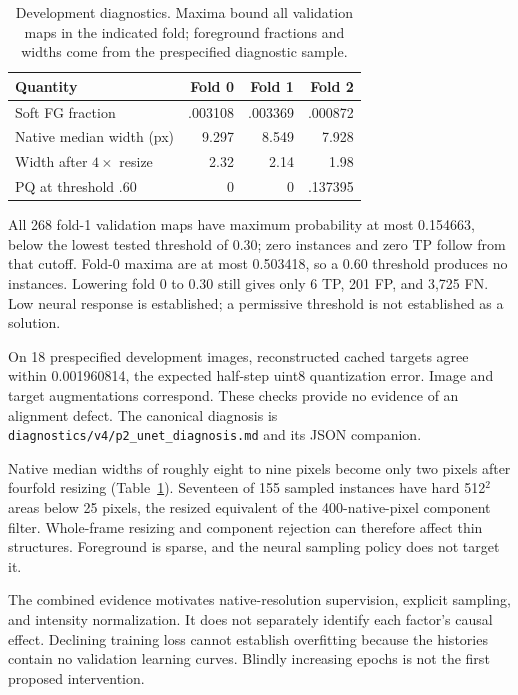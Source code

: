 \documentclass[sigconf]{acmart}
\begin{document}
\begin{table}[t]
\caption{Development diagnostics. Maxima bound all validation maps in the indicated fold; foreground fractions and widths come from the prespecified diagnostic sample.}
\label{tab:diag}
\centering
\begin{tabular}{lrrr}
\toprule
Quantity & Fold 0 & Fold 1 & Fold 2\\
\midrule
Soft FG fraction & .003108 & .003369 & .000872\\
Native median width (px) & 9.297 & 8.549 & 7.928\\
Width after $4\times$ resize & 2.32 & 2.14 & 1.98\\
PQ at threshold .60 & 0 & 0 & .137395\\
\bottomrule
\end{tabular}
\end{table}

All 268 fold-1 validation maps have maximum probability at most 0.154663, below the lowest tested threshold of 0.30; zero instances and zero TP follow from that cutoff. Fold-0 maxima are at most 0.503418, so a 0.60 threshold produces no instances. Lowering fold 0 to 0.30 still gives only 6 TP, 201 FP, and 3,725 FN. Low neural response is established; a permissive threshold is not established as a solution.

On 18 prespecified development images, reconstructed cached targets agree within 0.001960814, the expected half-step uint8 quantization error. Image and target augmentations correspond. These checks provide no evidence of an alignment defect. The canonical diagnosis is \texttt{diagnostics/v4/p2\_unet\_diagnosis.md} and its JSON companion.

Native median widths of roughly eight to nine pixels become only two pixels after fourfold resizing (Table~\ref{tab:diag}). Seventeen of 155 sampled instances have hard 512$^2$ areas below 25 pixels, the resized equivalent of the 400-native-pixel component filter. Whole-frame resizing and component rejection can therefore affect thin structures. Foreground is sparse, and the neural sampling policy does not target it.

The combined evidence motivates native-resolution supervision, explicit sampling, and intensity normalization. It does not separately identify each factor's causal effect. Declining training loss cannot establish overfitting because the histories contain no validation learning curves. Blindly increasing epochs is not the first proposed intervention.
\end{document}
